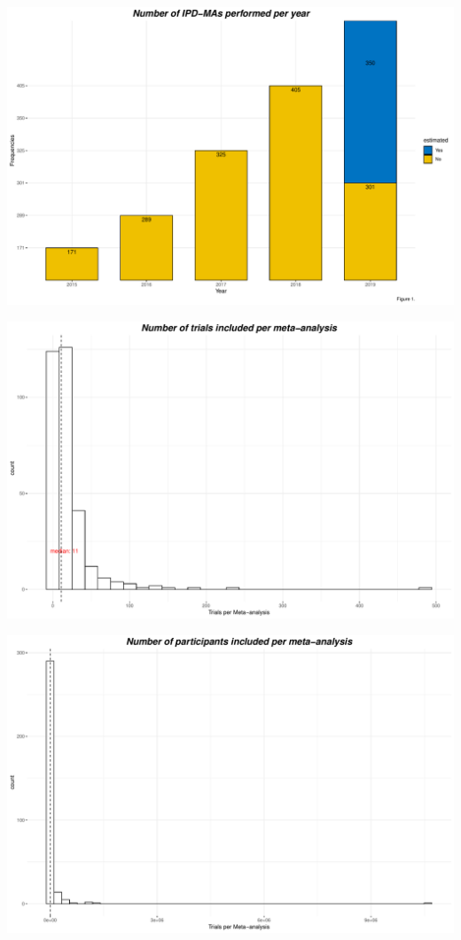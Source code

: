 \documentclass[]{article}
\let\oldsubparagraph\subparagraph
\renewcommand{\subparagraph}[1]{\oldsubparagraph{#1}\mbox{}}
\begin{document}
\newpage

\hypertarget{section-2}{%
\subparagraph{}\label{section-2}}

\includegraphics{Figs/unnamed-chunk-3-1.pdf}

\includegraphics{Figs/unnamed-chunk-4-1.pdf}

\includegraphics{Figs/unnamed-chunk-5-1.pdf}
\end{document}
